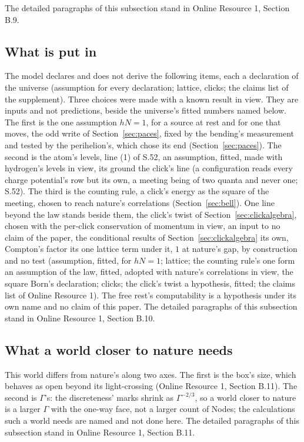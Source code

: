 \documentclass[pdflatex,sn-mathphys-num]{sn-jnl}
\theoremstyle{thmstyleone}
\theoremstyle{thmstyletwo}
\begin{document}
The detailed paragraphs of this subsection stand in Online Resource 1, Section B.9.

\subsection{What is put in}\label{sec:inputs}

The model declares and does not derive the following items, each a declaration of the universe (assumption for every declaration; lattice, clicks; the claims list of the supplement).
Three choices were made with a known result in view. They are inputs and not predictions, beside the universe's fitted numbers named below. The first is the one assumption $hN = 1$, for a source at rest and for one that moves, the odd write of Section~\ref{sec:paces}, fixed by the bending's measurement and tested by the perihelion's, which chose its end (Section~\ref{sec:paces}). The second is the atom's levels, line (1) of S.52, an assumption, fitted, made with hydrogen's levels in view, its ground the click's line (a configuration reads every charge potential's row but its own, a meeting being of two quanta and never one; S.52). The third is the counting rule, a click's energy as the square of the meeting, chosen to reach nature's correlations (Section~\ref{sec:bell}). One line beyond the law stands beside them, the click's twist of Section~\ref{sec:clickalgebra}, chosen with the per-click conservation of momentum in view, an input to no claim of the paper, the conditional results of Section~\ref{sec:clickalgebra} its own, Compton's factor its one lattice term under it, $1$ at nature's gap, by construction and no test (assumption, fitted, for $hN = 1$; lattice; the counting rule's one form an assumption of the law, fitted, adopted with nature's correlations in view, the square Born's declaration; clicks; the click's twist a hypothesis, fitted; the claims list of Online Resource 1). The free rest's computability is a hypothesis under its own name and no claim of this paper. The detailed paragraphs of this subsection stand in Online Resource 1, Section B.10.

\subsection{What a world closer to nature needs}\label{sec:closer}

This world differs from nature's along two axes. The first is the box's size, which behaves as open beyond its light-crossing (Online Resource 1, Section B.11). The second is $\Gamma$'s: the discreteness' marks shrink as $\Gamma^{-2/3}$, so a world closer to nature is a larger $\Gamma$ with the one-way face, not a larger count of Nodes; the calculations such a world needs are named and not done here. The detailed paragraphs of this subsection stand in Online Resource 1, Section B.11.
\end{document}

